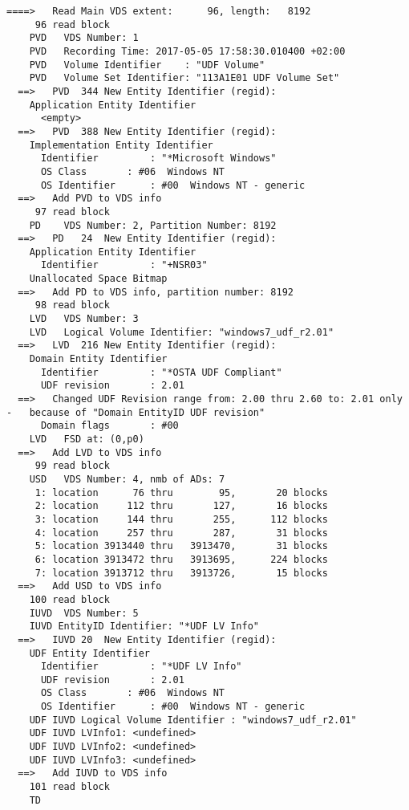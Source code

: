 \begin{lstlisting}
====>   Read Main VDS extent:      96, length:   8192
     96 read block
    PVD   VDS Number: 1
    PVD   Recording Time: 2017-05-05 17:58:30.010400 +02:00
    PVD   Volume Identifier    : "UDF Volume"
    PVD   Volume Set Identifier: "113A1E01 UDF Volume Set"
  ==>   PVD  344 New Entity Identifier (regid):
    Application Entity Identifier
      <empty>
  ==>   PVD  388 New Entity Identifier (regid):
    Implementation Entity Identifier
      Identifier         : "*Microsoft Windows"
      OS Class       : #06  Windows NT
      OS Identifier      : #00  Windows NT - generic
  ==>   Add PVD to VDS info
     97 read block
    PD    VDS Number: 2, Partition Number: 8192
  ==>   PD   24  New Entity Identifier (regid):
    Application Entity Identifier
      Identifier         : "+NSR03"
    Unallocated Space Bitmap
  ==>   Add PD to VDS info, partition number: 8192
     98 read block
    LVD   VDS Number: 3
    LVD   Logical Volume Identifier: "windows7_udf_r2.01"
  ==>   LVD  216 New Entity Identifier (regid):
    Domain Entity Identifier
      Identifier         : "*OSTA UDF Compliant"
      UDF revision       : 2.01
  ==>   Changed UDF Revision range from: 2.00 thru 2.60 to: 2.01 only
-   because of "Domain EntityID UDF revision"
      Domain flags       : #00
    LVD   FSD at: (0,p0)
  ==>   Add LVD to VDS info
     99 read block
    USD   VDS Number: 4, nmb of ADs: 7
     1: location      76 thru        95,       20 blocks
     2: location     112 thru       127,       16 blocks
     3: location     144 thru       255,      112 blocks
     4: location     257 thru       287,       31 blocks
     5: location 3913440 thru   3913470,       31 blocks
     6: location 3913472 thru   3913695,      224 blocks
     7: location 3913712 thru   3913726,       15 blocks
  ==>   Add USD to VDS info
    100 read block
    IUVD  VDS Number: 5
    IUVD EntityID Identifier: "*UDF LV Info"
  ==>   IUVD 20  New Entity Identifier (regid):
    UDF Entity Identifier
      Identifier         : "*UDF LV Info"
      UDF revision       : 2.01
      OS Class       : #06  Windows NT
      OS Identifier      : #00  Windows NT - generic
    UDF IUVD Logical Volume Identifier : "windows7_udf_r2.01"
    UDF IUVD LVInfo1: <undefined>
    UDF IUVD LVInfo2: <undefined>
    UDF IUVD LVInfo3: <undefined>
  ==>   Add IUVD to VDS info
    101 read block
    TD  


\end{lstlisting}
